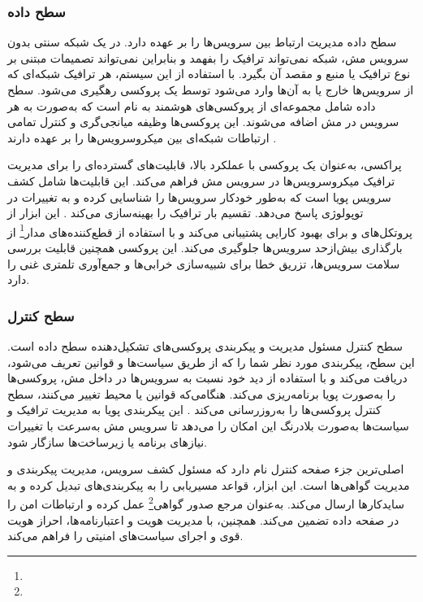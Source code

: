 \subsubsection{سطح داده}
سطح داده مدیریت ارتباط بین سرویس‌ها را بر عهده دارد. در یک شبکه سنتی بدون سرویس مش، شبکه نمی‌تواند ترافیک را بفهمد و بنابراین نمی‌تواند تصمیمات مبتنی بر نوع ترافیک یا منبع و مقصد آن بگیرد. با استفاده از این سیستم، هر ترافیک شبکه‌ای که از سرویس‌ها خارج یا به آن‌ها وارد می‌شود توسط یک پروکسی رهگیری می‌شود. سطح داده شامل مجموعه‌ای از پروکسی‌های هوشمند به نام  است که به‌صورت  به هر سرویس در مش اضافه می‌شوند. این پروکسی‌ها وظیفه میانجی‌گری و کنترل تمامی ارتباطات شبکه‌ای بین میکروسرویس‌ها را بر عهده دارند \cite{Istio2}.

پراکسی، به‌عنوان یک پروکسی با عملکرد بالا، قابلیت‌های گسترده‌ای را برای مدیریت ترافیک میکروسرویس‌ها در سرویس مش فراهم می‌کند. این قابلیت‌ها شامل کشف سرویس پویا است که به‌طور خودکار سرویس‌ها را شناسایی کرده و به تغییرات در توپولوژی پاسخ می‌دهد. تقسیم بار ترافیک را بهینه‌سازی می‌کند \cite{Istio2}. این ابزار از پروتکل‌های  و  برای بهبود کارایی پشتیبانی می‌کند و با استفاده از قطع‌کننده‌های مدار\footnote{} از بارگذاری بیش‌ازحد سرویس‌ها جلوگیری می‌کند. این پروکسی همچنین قابلیت بررسی سلامت سرویس‌ها، تزریق خطا برای شبیه‌سازی خرابی‌ها و جمع‌آوری تلمتری غنی را دارد.

\subsubsection{سطح کنترل}
سطح کنترل مسئول مدیریت و پیکربندی پروکسی‌های تشکیل‌دهنده سطح داده است. این سطح، پیکربندی مورد نظر شما را که از طریق سیاست‌ها و قوانین تعریف می‌شود، دریافت می‌کند و با استفاده از دید خود نسبت به سرویس‌ها در داخل مش، پروکسی‌ها را به‌صورت پویا برنامه‌ریزی می‌کند. هنگامی‌که قوانین یا محیط تغییر می‌کنند، سطح کنترل پروکسی‌ها را به‌روزرسانی می‌کند \cite{Istio2}. این پیکربندی پویا به مدیریت ترافیک و سیاست‌ها به‌صورت بلادرنگ این امکان را می‌دهد تا سرویس مش به‌سرعت با تغییرات نیازهای برنامه یا زیرساخت‌ها سازگار شود.

اصلی‌ترین جزء صفحه کنترل  نام دارد که مسئول کشف سرویس، مدیریت پیکربندی و مدیریت گواهی‌ها است. این ابزار، قواعد مسیریابی را به پیکربندی‌های  تبدیل کرده و به سایدکارها ارسال می‌کند.  به‌عنوان مرجع صدور گواهی\footnote{} عمل کرده و ارتباطات امن  را در صفحه داده تضمین می‌کند. همچنین، با مدیریت هویت و اعتبارنامه‌ها، احراز هویت قوی و اجرای سیاست‌های امنیتی را فراهم می‌کند.

